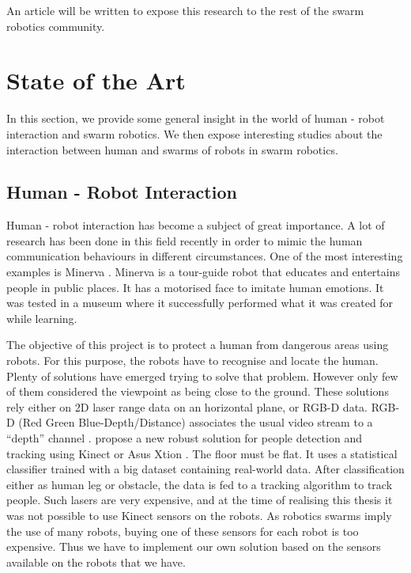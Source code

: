 \documentclass[oneside, a4paper, 12pt]{memoir}
\begin{document}
	An article will be written to expose this research to the rest of the swarm robotics community.

\chapter{State of the Art}
	\label{chap:state_of_the_art}
	In this section, we provide some general insight in the world of human - robot interaction and swarm robotics. We then expose interesting studies about the interaction between human and swarms of robots in swarm robotics.
	
	\section{Human - Robot Interaction}

		
		Human - robot interaction has become a subject of great importance. A lot of research has been done in this field recently in order to mimic the human communication behaviours in different circumstances. One of the most interesting examples is Minerva \citep{thrun1999minerva}. Minerva is a tour-guide robot that educates and entertains people in public places. It has a motorised face to imitate human emotions. It was tested in a museum where it successfully performed what it was created for while learning.
		
		The objective of this project is to protect a human from dangerous areas using robots. For this purpose, the robots have to recognise and locate the human. Plenty of solutions have emerged trying to solve that problem. However only few of them considered the viewpoint as being close to the ground. These solutions rely either on 2D laser range data on an horizontal plane, or RGB-D data. RGB-D (Red Green Blue-Depth/Distance) associates the usual video stream to a \enquote{depth} channel \citep{wiki:004}. \citet{gritti2014kinect} propose a new robust solution for people detection and tracking using Kinect \citep{kinect} or Asus Xtion \citep{asus}. The floor must be flat. It uses a statistical classifier trained with a big dataset containing real-world data. After classification either as human leg or obstacle, the data is fed to a tracking algorithm to track people. Such lasers are very expensive, and at the time of realising this thesis it was not possible to use Kinect sensors on the robots. As robotics swarms imply the use of many robots, buying one of these sensors for each robot is too expensive. Thus we have to implement our own solution based on the sensors available on the robots that we have.
		
\end{document}
